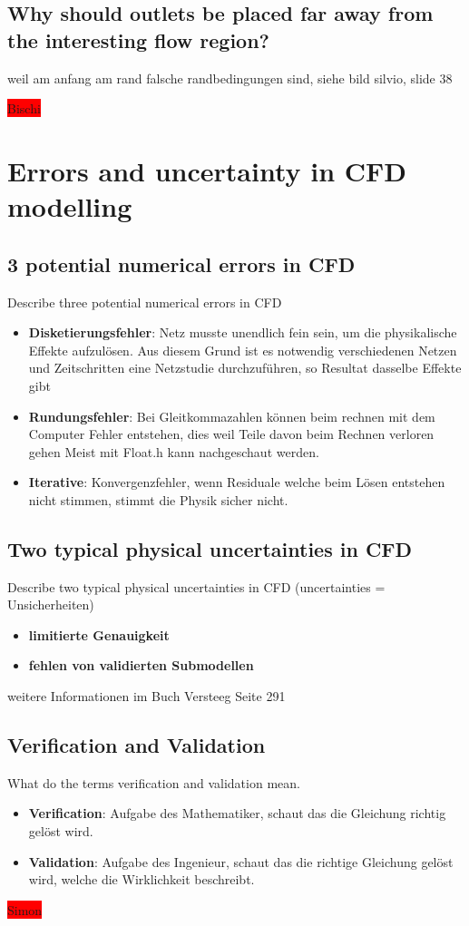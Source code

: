 \documentclass[a4paper]{scrartcl}
\begin{document}
\subsection{Why should outlets be placed far away from the interesting flow
region?}
 weil am anfang am rand falsche randbedingungen sind, siehe bild silvio,
slide 38

\colorbox{red}{Bischi}

\section{Errors and uncertainty in CFD modelling}

\subsection{3 potential numerical errors in CFD}

Describe three potential numerical errors in CFD
\begin{itemize}
\item \textbf{Disketierungsfehler}: Netz musste unendlich fein sein, um die physikalische Effekte aufzulösen. Aus diesem Grund ist es notwendig verschiedenen Netzen und Zeitschritten eine Netzstudie durchzuführen, so Resultat dasselbe Effekte gibt
\item \textbf{Rundungsfehler}: Bei Gleitkommazahlen können beim rechnen mit dem Computer Fehler entstehen, dies weil Teile davon beim Rechnen verloren  gehen Meist mit Float.h kann nachgeschaut werden.
\item \textbf{Iterative}: Konvergenzfehler, wenn Residuale welche beim Lösen entstehen nicht stimmen, stimmt die Physik sicher nicht.  
\end{itemize}

\subsection{Two typical physical uncertainties in CFD}
Describe two typical physical uncertainties in CFD (uncertainties =
Unsicherheiten)
\begin{itemize}
\item \textbf{limitierte Genauigkeit}
\item \textbf{fehlen von validierten Submodellen}
\end{itemize}
weitere Informationen im Buch Versteeg Seite 291

\subsection{Verification and Validation} 
What do the terms verification and
validation mean.
\begin{itemize}
\item \textbf{Verification}: Aufgabe des Mathematiker, schaut das die Gleichung richtig gelöst wird.
\item \textbf{Validation}: Aufgabe des Ingenieur, schaut das die richtige Gleichung gelöst wird, welche die Wirklichkeit beschreibt.
\end{itemize}


\colorbox{red}{Simon}
\end{document}
